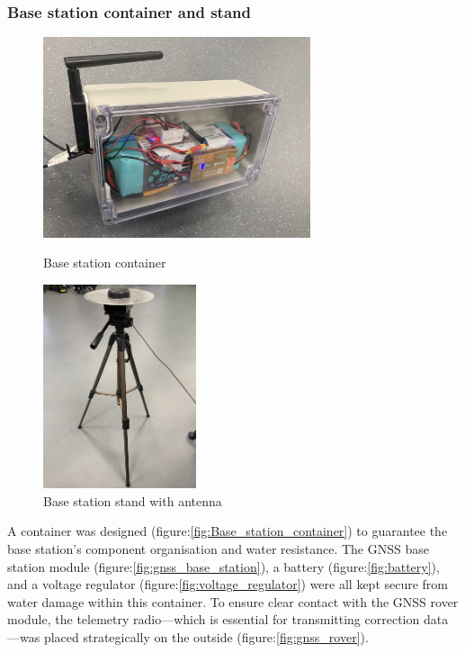 \documentclass{article}
\begin{document}
\subsubsection{Base station container and stand}
\begin{figure}[H]
  \begin{minipage}{.5\textwidth}
    \centering
    \includegraphics[width=0.7\textwidth]{Pictures/base_station_box.png}
    \caption{Base station container}
    \label{fig:Base_station_container}
  \end{minipage}
  \begin{minipage}{.5\textwidth}
    \centering
    \includegraphics[width=0.4\textwidth]{Pictures/base_station_stand.jpg}
    \caption{Base station stand with antenna}
    \label{fig:Base_station_stand}
  \end{minipage}
\end{figure}
A container was designed (figure:\ref{fig:Base_station_container}) to guarantee
the base station's component organisation and water resistance. The GNSS base
station module (figure:\ref{fig:gnss_base_station}), a battery
(figure:\ref{fig:battery}), and a voltage regulator
(figure:\ref{fig:voltage_regulator}) were all kept secure from water damage
within this container. To ensure clear contact with the GNSS rover module, the
telemetry radio—which is essential for transmitting correction data—was placed
strategically on the outside (figure:\ref{fig:gnss_rover}).
\end{document}
